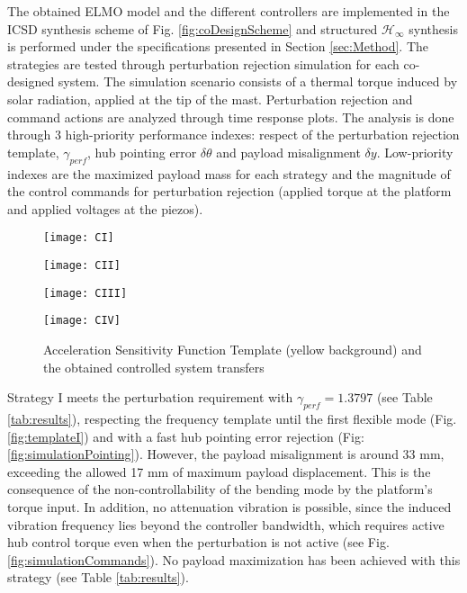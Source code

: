 \documentclass{ifacconf}
\begin{document}
The obtained ELMO model and the different controllers are implemented in the ICSD synthesis scheme of Fig. \ref{fig:coDesignScheme} and structured $\mathcal{H}_\infty$ synthesis is performed under the specifications presented in Section \ref{sec:Method}. The strategies are tested through perturbation rejection simulation for each co-designed system. The simulation scenario consists of a thermal torque induced by solar radiation, applied at the tip of the mast. Perturbation rejection and command actions are analyzed through time response plots. The analysis is done through 3 high-priority performance indexes: respect of the perturbation rejection template, $\gamma_{perf}$, hub pointing error $\delta \theta $ and payload misalignment $\delta y$. Low-priority indexes are the maximized payload mass for each strategy and the magnitude of the control commands for perturbation rejection (applied torque at the platform and applied voltages at the piezos).

\begin{figure*}[] 
  \begin{minipage}[b]{0.5\linewidth}
    \centering
    \texttt{[image: CI]}
     \label{fig:templateI}
  \end{minipage}\begin{minipage}[b]{0.5\linewidth}
    \centering
    \texttt{[image: CII]} 
 	\label{fig:templateII}
  \end{minipage} 
  \begin{minipage}[b]{0.5\linewidth}
    \centering
    \texttt{[image: CIII]} 
 \label{fig:templateIII}
  \end{minipage}\begin{minipage}[b]{0.5\linewidth}
    \centering
    \texttt{[image: CIV]} 
     \label{fig:templateIV}
  \end{minipage} 
  \caption{Acceleration Sensitivity Function Template (yellow background) and the obtained controlled system transfers}
  \label{fig:template} 
\end{figure*}

Strategy I meets the perturbation requirement with $\gamma_{perf} = 1.3797$ (see Table \ref{tab:results}), respecting the frequency template until the first flexible mode (Fig. \ref{fig:templateI}) and with a fast hub pointing error rejection (Fig: \ref{fig:simulationPointing}). However, the payload misalignment is around 33 mm, exceeding the allowed 17 mm of maximum payload displacement. This is the consequence of the non-controllability of the bending mode by the platform's torque input. In addition, no attenuation vibration is possible, since the induced vibration frequency lies beyond the controller bandwidth, which requires active hub control torque even when the perturbation is not active (see Fig. \ref{fig:simulationCommands}). No payload maximization has been achieved with this strategy (see Table \ref{tab:results}).
\end{document}
